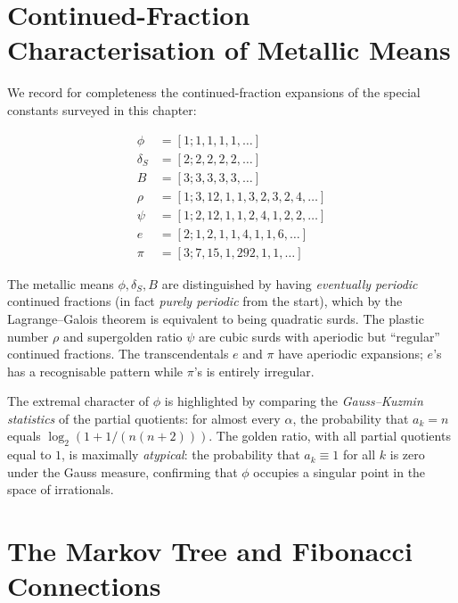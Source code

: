 \section{Continued-Fraction Characterisation of Metallic Means}
\label{sec:cf-characterisation}

We record for completeness the continued-fraction
expansions of the special constants surveyed
in this chapter:

\begin{align}
  \phi &= [1; 1, 1, 1, 1, \ldots]
        \label{eq:cf-phi}\\
  \delta_S &= [2; 2, 2, 2, 2, \ldots]
        \label{eq:cf-silver}\\
  B    &= [3; 3, 3, 3, 3, \ldots]
        \label{eq:cf-bronze}\\
  \rho &= [1; 3, 12, 1, 1, 3, 2, 3, 2, 4, \ldots]
        \label{eq:cf-plastic}\\
  \psi &= [1; 2, 12, 1, 1, 2, 4, 1, 2, 2, \ldots]
        \label{eq:cf-supergolden}\\
  e    &= [2; 1, 2, 1, 1, 4, 1, 1, 6, \ldots]
        \label{eq:cf-e}\\
  \pi  &= [3; 7, 15, 1, 292, 1, 1, \ldots]
        \label{eq:cf-pi}
\end{align}

The metallic means $\phi, \delta_S, B$ are
distinguished by having \emph{eventually periodic}
continued fractions (in fact \emph{purely periodic}
from the start), which by the Lagrange--Galois
theorem is equivalent to being quadratic surds.
The plastic number $\rho$ and supergolden ratio
$\psi$ are cubic surds with aperiodic but
``regular'' continued fractions.  The
transcendentals $e$ and $\pi$ have aperiodic
expansions; $e$'s has a recognisable pattern while
$\pi$'s is entirely irregular.

The extremal character of $\phi$ is highlighted
by comparing the \emph{Gauss--Kuzmin statistics}
of the partial quotients: for almost every $\alpha$,
the probability that $a_k = n$ equals
$\log_2(1 + 1/(n(n+2)))$.  The golden ratio,
with all partial quotients equal to $1$, is
maximally \emph{atypical}: the probability that
$a_k \equiv 1$ for all $k$ is zero under the
Gauss measure, confirming that $\phi$ occupies
a singular point in the space of irrationals.

\section{The Markov Tree and Fibonacci Connections}
\label{sec:markov-tree}

